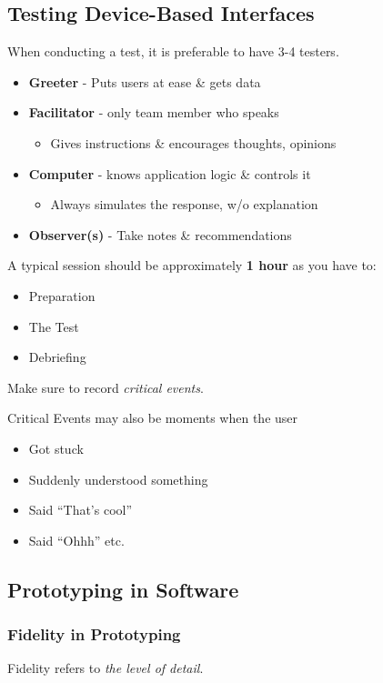 \subsection{Testing Device-Based Interfaces}
When conducting a test, it is preferable to have 3-4 testers.
\begin{itemize}
    \item \textbf{Greeter} - Puts users at ease \& gets data
    \item \textbf{Facilitator} - only team member who speaks
    \begin{itemize}
        \item Gives instructions \& encourages thoughts, opinions
    \end{itemize}
    \item \textbf{Computer} - knows application logic \& controls it
    \begin{itemize}
        \item Always simulates the response, w/o explanation
    \end{itemize}
    \item \textbf{Observer(s)} - Take notes \& recommendations
\end{itemize}
A typical session should be approximately \textbf{1 hour} as you have to:
\begin{itemize}
    \item Preparation
    \item The Test
    \item Debriefing
\end{itemize}

\begin{important}
    Make sure to record \textit{critical events}.

    Critical Events may also be moments when the user
    \begin{itemize}
        \item Got stuck
        \item Suddenly understood something
        \item Said ``That's cool''
        \item Said ``Ohhh'' etc. 
    \end{itemize}
\end{important}

\subsection{Prototyping in Software}
\subsubsection{Fidelity in Prototyping}
\begin{shaded}
    Fidelity refers to \textit{the level of detail}.
\end{shaded}

